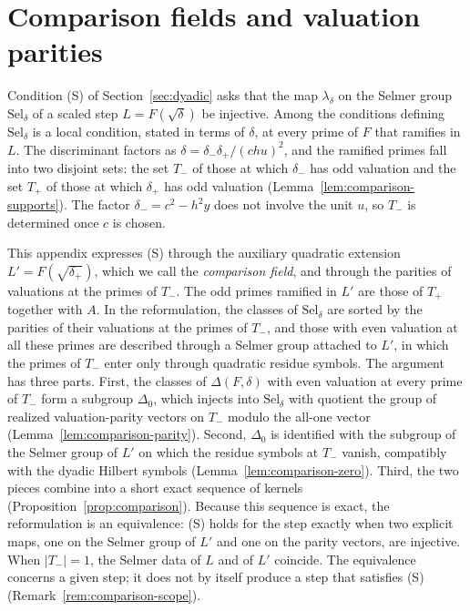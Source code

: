 \documentclass[11pt]{article}
\theoremstyle{plain}
\theoremstyle{definition}
\theoremstyle{remark}
\begin{document}
\section{Comparison fields and valuation parities}
\label{app:comparison}

Condition (S) of Section~\ref{sec:dyadic} asks that the map
$\lambda_\delta$ on the Selmer group $\mathrm{Sel}_\delta$ of a scaled step
$L=F(\sqrt\delta)$ be injective.  Among the conditions defining
$\mathrm{Sel}_\delta$ is a local condition, stated in terms of $\delta$,
at every prime of $F$ that ramifies in $L$.  The discriminant
factors as $\delta=\delta_-\delta_+/(chu)^2$, and the ramified primes fall
into two disjoint sets: the set $T_-$ of those at which $\delta_-$ has odd
valuation and the set $T_+$ of those at which $\delta_+$ has odd valuation
(Lemma~\ref{lem:comparison-supports}).  The factor $\delta_-=c^2-h^2y$
does not involve the unit $u$, so $T_-$ is determined once $c$ is chosen.

This appendix expresses (S) through the auxiliary quadratic extension
$L'=F(\sqrt{\delta_+})$, which we call the \emph{comparison field}, and
through the parities of valuations at the primes of $T_-$.  The odd primes
ramified in $L'$ are those of $T_+$ together with $A$.  In the
reformulation, the classes of $\mathrm{Sel}_\delta$ are sorted by the
parities of their valuations at the primes of $T_-$, and those with even
valuation at all these primes are described through a Selmer group
attached to $L'$, in which the primes of $T_-$ enter only through
quadratic residue symbols.  The argument has three
parts.  First, the classes of $\Delta(F,\delta)$ with even valuation at
every prime of $T_-$ form a subgroup $\Delta_0$, which injects into
$\mathrm{Sel}_\delta$ with quotient the group of realized valuation-parity
vectors on $T_-$ modulo the all-one vector
(Lemma~\ref{lem:comparison-parity}).  Second, $\Delta_0$ is identified
with the subgroup of the Selmer group of $L'$ on which the residue symbols
at $T_-$ vanish, compatibly with the dyadic Hilbert symbols
(Lemma~\ref{lem:comparison-zero}).  Third, the two pieces combine into a
short exact sequence of kernels (Proposition~\ref{prop:comparison}).
Because this sequence is exact, the reformulation is an equivalence: (S)
holds for the step exactly when two explicit maps, one on the Selmer group
of $L'$ and one on the parity vectors, are injective.  When $|T_-|=1$, the
Selmer data of $L$ and of $L'$ coincide.  The equivalence concerns a given
step; it does not by itself produce a step that satisfies (S)
(Remark~\ref{rem:comparison-scope}).
\end{document}
